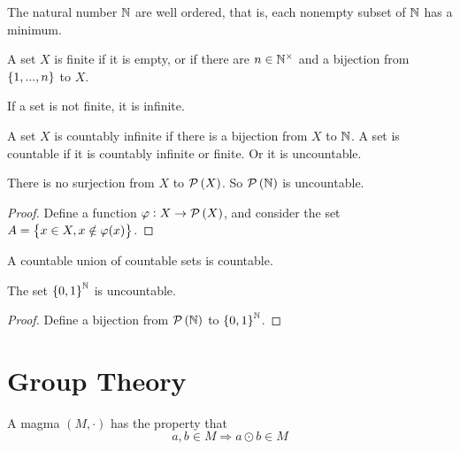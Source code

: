 \begin{theorem}
    The natural number $\mathbb{N}$ are well ordered, that is, each nonempty subset of $\mathbb{N}$ has a minimum.
\end{theorem}


\begin{definition}
    A set $X$ is finite if it is empty, or if there are $n \in \mathbb{N}^{\times}$ and a bijection from $\set{1, ..., n}$ to $X$.
    
    If a set is not finite, it is infinite.
    
    A set $X$ is countably infinite if there is a bijection from $X$ to $\mathbb{N}$. A set is countable if it is countably infinite or finite. Or it is uncountable.
\end{definition}

\begin{theorem}
    There is no surjection from $X$ to $\mathcal{P}\left( X \right)$. So $\mathcal{P}\left( \mathbb{N} \right)$ is uncountable.
\end{theorem}
\begin{proof}
    Define a function $\varphi: X \rightarrow \mathcal{P}\left( X \right)$, and consider the set $A = \set{x\in X, x \notin \varphi(x)}$.
\end{proof}


\begin{theorem}
A countable union of countable sets is countable.    
\end{theorem}

\begin{theorem}
The set $\set{0,1}^{\mathbb{N}}$ is uncountable.
\end{theorem}
\begin{proof}
    Define a bijection from $\mathcal{P}\left( \mathbb{N} \right)$ to $\set{0,1}^{\mathbb{N}}$.
\end{proof}


\section{Group Theory}

%
%

\begin{definition}[magma]
    A magma $(M, \cdot)$ has the property that
    \begin{equation}
        a, b \in M \Rightarrow a \odot b \in M
    \end{equation}
\end{definition}


